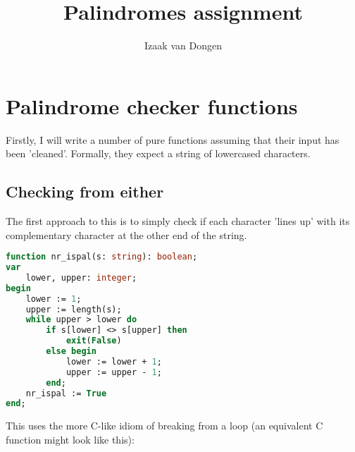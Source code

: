 \documentclass{article}
\title{Palindromes assignment}
\author{Izaak van Dongen}
\begin{document}
    \maketitle
    \tableofcontents
    \lstlistoflistings

    \section{Palindrome checker functions}
    Firstly, I will write a number of pure functions assuming that their input
    has been 'cleaned'. Formally, they expect a string of lowercased
    characters.
    \subsection{Checking from either }
    The first approach to this is to simply check if each character 'lines up'
    with its complementary character at the other end of the string.

\begin{lstlisting}[language=Pascal, caption=Nonrecursive palindrome function]
function nr_ispal(s: string): boolean;
var
    lower, upper: integer;
begin
    lower := 1;
    upper := length(s);
    while upper > lower do
        if s[lower] <> s[upper] then
            exit(False)
        else begin
            lower := lower + 1;
            upper := upper - 1;
        end;
    nr_ispal := True
end;
\end{lstlisting}

    This uses the more C-like idiom of breaking from a loop (an equivalent C
    function might look like this):
\end{document}

